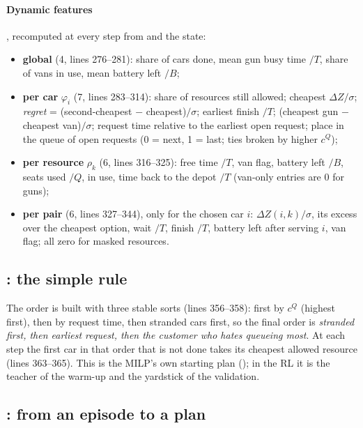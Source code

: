 \paragraph{Dynamic features}, recomputed at every step from  and the state:
\begin{itemize}
  \item \textbf{global} (4, lines 276--281): share of cars done, mean gun busy time $/T$, share of vans in use, mean battery left $/B$;
  \item \textbf{per car} $\varphi_i$ (7, lines 283--314): share of resources still allowed; cheapest $\Delta Z/\sigma$; \emph{regret} = (second-cheapest $-$ cheapest)$/\sigma$; earliest finish $/T$; (cheapest gun $-$ cheapest van)$/\sigma$; request time relative to the earliest open request; place in the queue of open requests (0 = next, 1 = last; ties broken by higher $c^Q$);
  \item \textbf{per resource} $\rho_k$ (6, lines 316--325): free time $/T$, van flag, battery left $/B$, seats used $/Q$, in use, time back to the depot $/T$ (van-only entries are 0 for guns);
  \item \textbf{per pair} (6, lines 327--344), only for the chosen car $i$: $\Delta Z(i,k)/\sigma$, its excess over the cheapest option, wait $/T$, finish $/T$, battery left after serving $i$, van flag; all zero for masked resources.
\end{itemize}

\subsection{: the simple rule}


The order is built with three stable sorts (lines 356--358): first by $c^Q$ (highest first), then by request time, then stranded cars first, so the final order is \emph{stranded first, then earliest request, then the customer who hates queueing most}. At each step the first car in that order that is not done takes its cheapest allowed resource (lines 363--365). This is the MILP's own starting plan (); in the RL it is the teacher of the warm-up and the yardstick of the validation.

\subsection{: from an episode to a plan}

